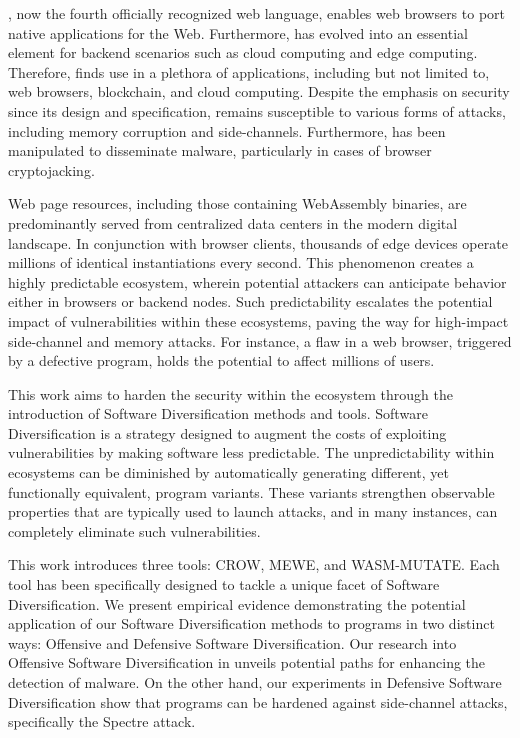 \Wasm, now the fourth officially recognized web language, enables web browsers to port native applications for the Web. 
Furthermore, \Wasm has evolved into an essential element for backend scenarios such as cloud computing and edge computing. 
Therefore, \Wasm finds use in a plethora of applications, including but not limited to, web browsers, blockchain, and cloud computing. 
Despite the emphasis on security since its design and specification, \Wasm remains susceptible to various forms of attacks, including memory corruption and side-channels. 
Furthermore, \Wasm has been manipulated to disseminate malware, particularly in cases of browser cryptojacking. 

Web page resources, including those containing WebAssembly binaries, are predominantly served from centralized data centers in the modern digital landscape. 
In conjunction with browser clients, thousands of edge devices operate millions of identical \Wasm instantiations every second. 
This phenomenon creates a highly predictable ecosystem, wherein potential attackers can anticipate behavior either in browsers or backend nodes. 
Such predictability escalates the potential impact of vulnerabilities within these ecosystems, paving the way for high-impact side-channel and memory attacks. 
For instance, a flaw in a web browser, triggered by a defective \Wasm program, holds the potential to affect millions of users.


This work aims to harden the security within the \Wasm ecosystem through the introduction of Software Diversification methods and tools. 
Software Diversification is a strategy designed to augment the costs of exploiting vulnerabilities by making software less predictable.
The unpredictability within ecosystems can be diminished by automatically generating different, yet functionally equivalent, program variants. 
These variants strengthen observable properties that are typically used to launch attacks, and in many instances, can completely eliminate such vulnerabilities. 


This work introduces three tools: CROW, MEWE, and WASM-MUTATE. 
Each tool has been specifically designed to tackle a unique facet of Software Diversification. 
We present empirical evidence demonstrating the potential application of our Software Diversification methods to \Wasm programs in two distinct ways: Offensive and Defensive Software Diversification. 
Our research into Offensive Software Diversification in \Wasm unveils potential paths for enhancing the detection of \Wasm malware. 
On the other hand, our experiments in Defensive Software Diversification show that \Wasm programs can be hardened against side-channel attacks, specifically the Spectre attack.


